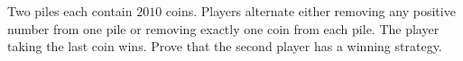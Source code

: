 Two piles each contain $2010$ coins. Players alternate either removing any positive number from one pile or removing exactly one coin from each pile. The player taking the last coin wins. Prove that the second player has a winning strategy.
